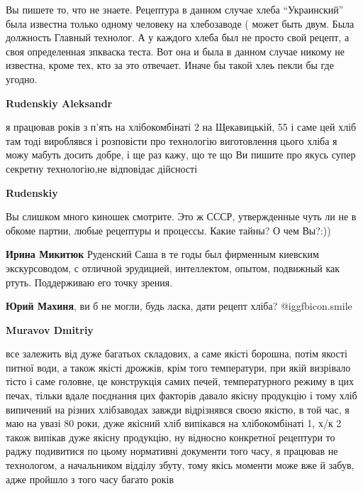 \begin{itemize}
\begin{itemize}

Вы пишете то, что не знаете. Рецептура в данном случае хлеба \enquote{Украинский} была
известна только одному человеку на хлебозаводе ( может быть двум. Была должность
Главный технолог. А у каждого хлеба был не просто свой рецепт, а своя
определенная зпкваска теста. Вот она и была в данном случае никому не известна,
кроме тех, кто за это отвечает. Иначе бы такой хлеь пекли бы где угодно.

\begin{itemize} %
\textbf{Rudenskiy Aleksandr} 

я працював років з п'ять на хлібокомбінаті 2 на Щекавицькій, 55 і саме цей хліб
там тоді вироблявся і розповісти про технологію виготовлення цього хліба я можу
мабуть досить добре, і ще раз кажу, що те що Ви пишите про якусь супер секретну
технологію,не відповідає дійсності

\textbf{Rudenskiy} 

Вы слишком много киношек смотрите. Это ж СССР, утвержденные чуть ли не в обкоме
партии, любые рецептуры и процессы. Какие тайны? О чем Вы?:))

\textbf{Ирина Микитюк} Руденский Саша в те годы был фирменным киевским экскурсоводом, с отличной эрудицией, интеллектом, опытом, подвижный как ртуть. Поддерживаю его точку зрения.
\end{itemize} %

\textbf{Юрий Махиня}, ви б не могли, будь ласка, дати рецепт хліба?  @igg{fbicon.smile} 

\begin{itemize} %
\textbf{Muravov Dmitriy} 

все залежить від дуже багатьох складових, а саме якісті борошна, потім якості
питної води, а також якісті дрожжів, крім того температури, при якій визрівало
тісто і саме головне, це конструкція самих печей, температурного режиму в цих
печах, тільки вдале поєднання цих факторів давало якісну продукцію і тому хліб
випичений на різних хлібзаводах завжди відрізнявся своєю якістю, в той час, я
маю на увазі 80 роки, дуже якісний хліб випікався на хлібокомбінаті 1, х/к 2
також випікав дуже якісну продукцію, ну відносно конкретної рецептури то раджу
подивитися по цьому нормативні документи того часу, я працював не технологом, а
начальником відділу збуту, тому якісь моменти може вже й забув, адже пройшло з
того часу багато років


\end{itemize}
\end{itemize}
\end{itemize}
